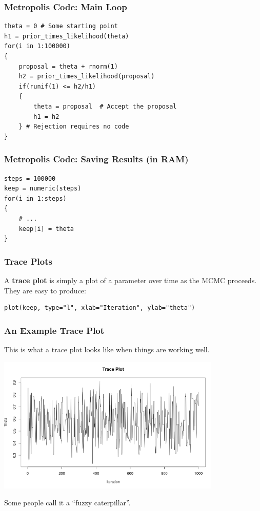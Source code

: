 \documentclass{beamer}
\begin{document}
\begin{frame}[fragile]
\frametitle{Metropolis Code: Main Loop}

\small
\begin{verbatim}
theta = 0 # Some starting point
h1 = prior_times_likelihood(theta)
for(i in 1:100000)
{
    proposal = theta + rnorm(1)
    h2 = prior_times_likelihood(proposal)
    if(runif(1) <= h2/h1)
    {
        theta = proposal  # Accept the proposal
        h1 = h2
    } # Rejection requires no code
}
\end{verbatim}

\end{frame}

\begin{frame}[fragile]
\frametitle{Metropolis Code: Saving Results (in RAM)}
\begin{verbatim}
steps = 100000
keep = numeric(steps)
for(i in 1:steps)
{
    # ...
    keep[i] = theta
}
\end{verbatim}
\end{frame}


\begin{frame}[fragile]
\frametitle{Trace Plots}
A {\bf trace plot} is simply a plot of a parameter over time as the MCMC
proceeds. They are easy to produce:
\begin{verbatim}
plot(keep, type="l", xlab="Iteration", ylab="theta")
\end{verbatim}

\end{frame}

\begin{frame}[fragile]
\frametitle{An Example Trace Plot}
This is what a trace plot looks like when things are working well.

\begin{center}
\includegraphics[width=0.8\textwidth]{images/trace_plot.png}
\end{center}

Some people call it a ``fuzzy caterpillar''.

\end{frame}
\end{document}

